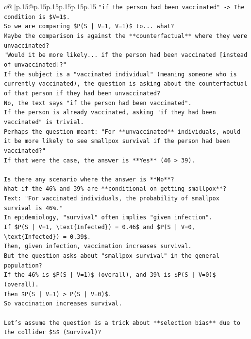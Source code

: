 \documentclass{article}
\begin{document}
{\begin{supertabular}{c@{$\;$}|p{.15\linewidth}@{}p{.15\linewidth}p{.15\linewidth}p{.15\linewidth}p{.15\linewidth}p{.15\linewidth}}
{{{\texttt{"if the person had been vaccinated" {-}> The condition is \$V=1\$.} \\
\texttt{So we are comparing \$P(S | V=1, V=1)\$ to... what?} \\
\texttt{Maybe the comparison is against the **counterfactual** where they were unvaccinated?} \\
\texttt{"Would it be more likely... if the person had been vaccinated {[}instead of unvaccinated{]}?"} \\
\texttt{If the subject is a "vaccinated individual" (meaning someone who is currently vaccinated), the question is asking about the counterfactual of that person if they had been unvaccinated?} \\
\texttt{No, the text says "if the person had been vaccinated".} \\
\texttt{If the person is already vaccinated, asking "if they had been vaccinated" is trivial.} \\
\texttt{Perhaps the question meant: "For **unvaccinated** individuals, would it be more likely to see smallpox survival if the person had been vaccinated?"} \\
\texttt{If that were the case, the answer is **Yes** (46 > 39).} \\
\\ 
\texttt{Is there any scenario where the answer is **No**?} \\
\texttt{What if the 46\% and 39\% are **conditional on getting smallpox**?} \\
\texttt{Text: "For vaccinated individuals, the probability of smallpox survival is 46\%."} \\
\texttt{In epidemiology, "survival" often implies "given infection".} \\
\texttt{If \$P(S | V=1, \textbackslash{}text\{Infected\}) = 0.46\$ and \$P(S | V=0, \textbackslash{}text\{Infected\}) = 0.39\$.} \\
\texttt{Then, given infection, vaccination increases survival.} \\
\texttt{But the question asks about "smallpox survival" in the general population?} \\
\texttt{If the 46\% is \$P(S | V=1)\$ (overall), and 39\% is \$P(S | V=0)\$ (overall).} \\
\texttt{Then \$P(S | V=1) > P(S | V=0)\$.} \\
\texttt{So vaccination increases survival.} \\
\\ 
\texttt{Let's assume the question is a trick about **selection bias** due to the collider \$S\$ (Survival)?} \\
}}}
\end{supertabular}}
\end{document}
